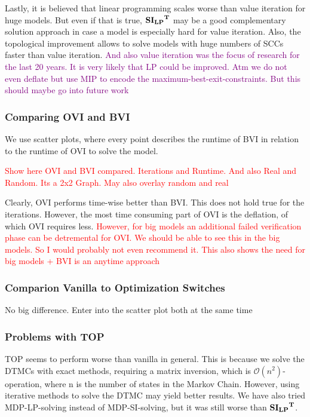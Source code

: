 Lastly, it is believed that linear programming scales worse than value iteration for huge models. But even if that is true,
$\mathbf{\mathbf{SI_{LP}}^T}$ may be a good complementary solution approach in case a model is especially hard for value iteration.
Also, the topological improvement allows to solve models with huge numbers of SCCs faster than value iteration.
\textcolor{purple}{And also value iteration was the focus of research for the last 20 years. 
It is very likely that LP could be improved. Atm we do not even deflate but use MIP to encode the maximum-best-exit-constraints. But this should maybe go into future work}


\subsubsection*{Comparing OVI and BVI}
We use scatter plots, where every point describes the runtime of BVI in relation to the runtime of OVI to solve the model.

\textcolor{red}{Show here OVI and BVI compared. Iterations and Runtime. And also Real and Random. Its a 2x2 Graph. May also overlay random and real}

Clearly, OVI performs time-wise better than BVI. This does not hold true for the iterations. However, the most time consuming part of OVI is the deflation, of which OVI requires less.
\textcolor{red}{However, for big models an additional failed verification phase can be detremental for OVI. We should be able to see this in the big models. So I would probably not even recommend it.
This also shows the need for big models + BVI is an anytime approach}


\subsubsection*{Comparion Vanilla to Optimization Switches}
No big difference. Enter into the scatter plot both at the same time

\subsubsection*{Problems with TOP}
TOP seems to perform worse than vanilla in general. This is because we solve the DTMCs with exact methods, 
requiring a matrix inversion, which is $\mathcal{O}(n^{2})$-operation, where n is the number of states in the Markov Chain.
However, using iterative methods to solve the DTMC may yield better results. We have also tried MDP-LP-solving instead of MDP-SI-solving, but it was
still worse than $\mathbf{\mathbf{SI_{LP}}^T}$.

